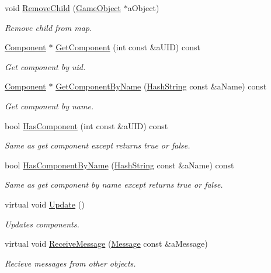 \begin{DoxyCompactItemize}
void \hyperlink{classGameObject_a4b36e22771bc918796ff305b644258fd}{Remove\+Child} (\hyperlink{classGameObject}{Game\+Object} $\ast$a\+Object)
\begin{DoxyCompactList}\small\item\em Remove child from map. \end{DoxyCompactList}\item 
\hyperlink{classComponent}{Component} $\ast$ \hyperlink{classGameObject_ae0e28ffdf80791934b43541bd4622f27}{Get\+Component} (int const \&a\+U\+ID) const 
\begin{DoxyCompactList}\small\item\em Get component by uid. \end{DoxyCompactList}\item 
\hyperlink{classComponent}{Component} $\ast$ \hyperlink{classGameObject_ae7fa2a011397c96e04cd55254ea5f9e9}{Get\+Component\+By\+Name} (\hyperlink{classHashString}{Hash\+String} const \&a\+Name) const 
\begin{DoxyCompactList}\small\item\em Get component by name. \end{DoxyCompactList}\item 
bool \hyperlink{classGameObject_adcfb2f642cc4f63bc957c9bec2739eb4}{Has\+Component} (int const \&a\+U\+ID) const 
\begin{DoxyCompactList}\small\item\em Same as get component except returns true or false. \end{DoxyCompactList}\item 
bool \hyperlink{classGameObject_aa39aa3d12cc4ab8da6b889f5317c402f}{Has\+Component\+By\+Name} (\hyperlink{classHashString}{Hash\+String} const \&a\+Name) const 
\begin{DoxyCompactList}\small\item\em Same as get component by name except returns true or false. \end{DoxyCompactList}\item 
virtual void \hyperlink{classGameObject_a1bd14aa169f501f94f1721943d716535}{Update} ()
\begin{DoxyCompactList}\small\item\em Updates components. \end{DoxyCompactList}\item 
virtual void \hyperlink{classGameObject_a9e03cac680603c4166c82a9432b90ee5}{Receive\+Message} (\hyperlink{classMessage}{Message} const \&a\+Message)
\begin{DoxyCompactList}\small\item\em Recieve messages from other objects. \end{DoxyCompactList}\item 

\end{DoxyCompactItemize}
